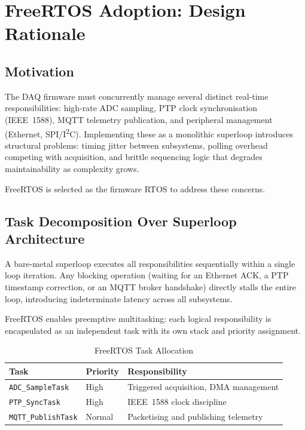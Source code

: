 \section{FreeRTOS Adoption: Design Rationale}

\subsection{Motivation}

The DAQ firmware must concurrently manage several distinct real-time responsibilities:
high-rate ADC sampling, PTP clock synchronisation (IEEE~1588), MQTT telemetry
publication, and peripheral management (Ethernet, SPI/I\textsuperscript{2}C).
Implementing these as a monolithic superloop introduces structural problems: timing
jitter between subsystems, polling overhead competing with acquisition, and brittle
sequencing logic that degrades maintainability as complexity grows.

FreeRTOS is selected as the firmware RTOS to address these concerns.

\subsection{Task Decomposition Over Superloop Architecture}

A bare-metal superloop executes all responsibilities sequentially within a single loop
iteration. Any blocking operation (waiting for an Ethernet ACK, a PTP timestamp
correction, or an MQTT broker handshake) directly stalls the entire loop, introducing
indeterminate latency across all subsystems.

FreeRTOS enables preemptive multitasking: each logical responsibility is encapsulated
as an independent task with its own stack and priority assignment.

\begin{table}[h]
    \centering
    \caption{FreeRTOS Task Allocation}
    \label{tab:freertos-tasks}
    \begin{tabular}{lll}
      \hline
        \textbf{Task} & \textbf{Priority} & \textbf{Responsibility} \\
        \hline
        \texttt{ADC\_SampleTask}    & High   & Triggered acquisition, DMA management \\
        \texttt{PTP\_SyncTask}      & High   & IEEE~1588 clock discipline \\
        \texttt{MQTT\_PublishTask}  & Normal & Packetising and publishing telemetry \\
        \hline
    \end{tabular}
\end{table}

